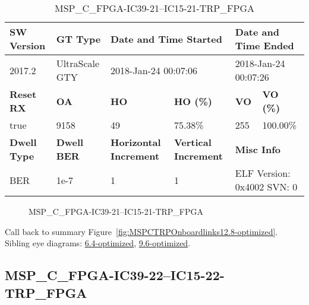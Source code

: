 \begin{table}[h]
\centering
\caption{MSP\_C\_FPGA-IC39-21--IC15-21-TRP\_FPGA}
\label{tab:MSPCFPGAIC3921IC1521TRPFPGA12.8-optimized}
\begin{tabular}{@{}|l|l|l|l|l|l|@{}}
\toprule
\textbf{SW Version}                & \textbf{GT Type}   & \multicolumn{2}{l|}{\textbf{Date and Time Started}}            & \multicolumn{2}{l|}{\textbf{Date and Time Ended}}        \\ \midrule
2017.2                       & UltraScale GTY          & \multicolumn{2}{l|}{2018-Jan-24 00:07:06}                   & \multicolumn{2}{l|}{2018-Jan-24 00:07:26}               \\ \midrule
\textbf{Reset RX}                  & \textbf{OA} & \textbf{HO}   & \textbf{HO (\%)} & \textbf{VO} & \textbf{VO (\%)} \\ \midrule
true & 9158        & 49          & 75.38\%        & 255        & 100.00\%       \\ \midrule
\textbf{Dwell Type}                & \textbf{Dwell BER} & \textbf{Horizontal Increment} & \textbf{Vertical Increment}    & \multicolumn{2}{l|}{\textbf{Misc Info}}                  \\ \midrule
BER                            & 1e-7        & 1        & 1           & \multicolumn{2}{l|}{ELF Version: 0x4002 SVN: 0}                         \\ \bottomrule
\end{tabular}
\end{table}

\begin{figure}[h]
\caption{MSP\_C\_FPGA-IC39-21--IC15-21-TRP\_FPGA} \label{fig:MSPCFPGAIC3921IC1521TRPFPGA12.8-optimized}
\end{figure}

Call back to summary Figure~\ref{fig:MSPCTRPOnboardlinks12.8-optimized}.
Sibling eye diagrams: \hyperref[sec:MSPCFPGAIC3921IC1521TRPFPGA6.4-optimized]{6.4-optimized}, \hyperref[sec:MSPCFPGAIC3921IC1521TRPFPGA9.6-optimized]{9.6-optimized}.

\clearpage
\newpage


\subsection{MSP\_C\_FPGA-IC39-22--IC15-22-TRP\_FPGA}\label{sec:MSPCFPGAIC3922IC1522TRPFPGA12.8-optimized}

